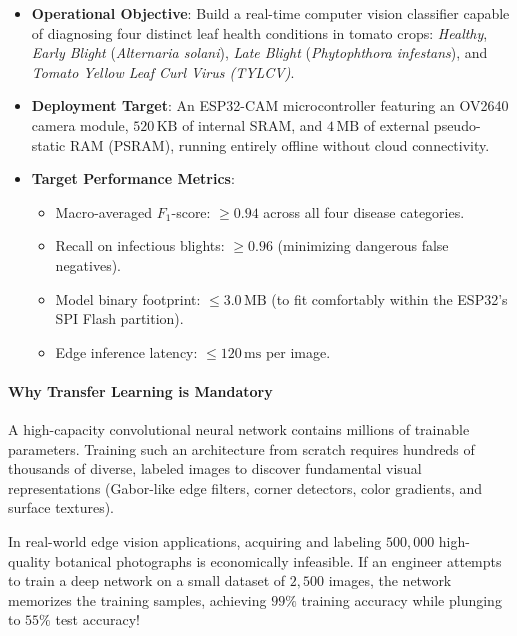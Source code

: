 \begin{keyidea}
\begin{itemize}
    \item \textbf{Operational Objective}: Build a real-time computer vision classifier capable of diagnosing four distinct leaf health conditions in tomato crops: \emph{Healthy}, \emph{Early Blight} (\emph{Alternaria solani}), \emph{Late Blight} (\emph{Phytophthora infestans}), and \emph{Tomato Yellow Leaf Curl Virus (TYLCV)}.
    \item \textbf{Deployment Target}: An ESP32-CAM microcontroller featuring an OV2640 camera module, $520\,\text{KB}$ of internal SRAM, and $4\,\text{MB}$ of external pseudo-static RAM (PSRAM), running entirely offline without cloud connectivity.
    \item \textbf{Target Performance Metrics}:
    \begin{itemize}
        \item Macro-averaged $F_1$-score: $\ge 0.94$ across all four disease categories.
        \item Recall on infectious blights: $\ge 0.96$ (minimizing dangerous false negatives).
        \item Model binary footprint: $\le 3.0\,\text{MB}$ (to fit comfortably within the ESP32's SPI Flash partition).
        \item Edge inference latency: $\le 120\,\text{ms}$ per image.
    \end{itemize}
\end{itemize}
\end{keyidea}

\paragraph{Why Transfer Learning is Mandatory}
A high-capacity convolutional neural network contains millions of trainable parameters. Training such an architecture from scratch requires hundreds of thousands of diverse, labeled images to discover fundamental visual representations (Gabor-like edge filters, corner detectors, color gradients, and surface textures).

In real-world edge vision applications, acquiring and labeling $500{,}000$ high-quality botanical photographs is economically infeasible. If an engineer attempts to train a deep network on a small dataset of $2{,}500$ images, the network memorizes the training samples, achieving $99\%$ training accuracy while plunging to $55\%$ test accuracy!

